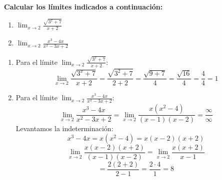 \documentclass[answers]{exam} %
\begin{document}
\begin{questions}
	\vspace{0.5cm}

	\question \large\textbf{Calcular los límites indicados a continuación:}
	\begin{enumerate}[label=\alph*.]
		\item $\displaystyle \lim_{x\to{2}} \frac{\sqrt{3^x+7}}{x+2}$
		\item $\displaystyle \lim_{x\to{2}} \frac{x^3-4x}{x^2-3x+2}$
	\end{enumerate}
	\vspace{0.5cm}
	\begin{solution}
		\begin{enumerate}[label=\alph*.]
			\item Para el límite $\displaystyle \lim_{x\to{2}} \frac{\sqrt{3^x+7}}{x+2}$:
			      \[
				      \lim_{x \to 2} \frac{\sqrt{3^x+7}}{x+2} = \frac{\sqrt{3^2+7}}{2+2} = \frac{\sqrt{9+7}}{4} = \frac{\sqrt{16}}{4} = \frac{4}{4} = 1
			      \]

			\item Para el límite $\displaystyle \lim_{x\to{2}} \frac{x^3-4x}{x^2-3x+2}$:
			      \[
				      \lim_{x \to 2} \frac{x^3-4x}{x^2-3x+2} = \lim_{x \to 2} \frac{x(x^2-4)}{(x-1)(x-2)}= \frac{\infty}{\infty}
			      \]
			      Levantamos la indeterminación:
			      \[
				      x^3-4x = x(x^2-4) = x(x-2)(x+2)
			      \]
			      \[
				      \lim_{x \to 2} \frac{x(x-2)(x+2)}{(x-1)(x-2)} = \lim_{x \to 2} \frac{x(x+2)}{x-1}
			      \]
			      \vspace{0.1cm}
			      \[
				      = \frac{2(2+2)}{2-1} = \frac{2 \cdot 4}{1} = 8
			      \]
		\end{enumerate}
	\end{solution}

	\vspace{0.5cm}

\end{questions}
\end{document}
